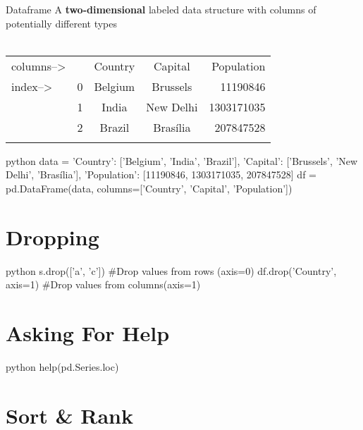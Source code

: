 \begin{myblock}{Dataframe}
A \textbf{two-dimensional} labeled data structure with columns of potentially different types\\\\

\begin{tabular}{ l|c||c|c|r| } 
\hhline{~----}
 columns--> &  & \cellcolor[HTML]{FFFFFF}  Country & \cellcolor[HTML]{FFFFFF}  Capital & \cellcolor[HTML]{FFFFFF}  Population\\
 \hhline{~====}
 index--> & \cellcolor[HTML]{FFFFFF} 0 & Belgium & Brussels & 11190846\\
 \hhline{~----}
  & \cellcolor[HTML]{FFFFFF} 1 & India & New Delhi & 1303171035\\
 \hhline{~----}
  & \cellcolor[HTML]{FFFFFF} 2 & Brazil & Brasília & 207847528\\
 \hhline{~----}
\end{tabular}
\end{myblock}

\begin{codebox}{python}{}
data = {'Country': ['Belgium', 'India', 'Brazil'], 'Capital': ['Brussels', 'New Delhi', 'Brasília'], 'Population': [11190846, 1303171035, 207847528]}
df = pd.DataFrame(data, columns=['Country', 'Capital', 'Population'])
\end{codebox}

\section{Dropping}

\begin{codebox}{python}{}
s.drop(['a', 'c'])  #Drop values from rows (axis=0)
df.drop('Country', axis=1) #Drop values from columns(axis=1)
\end{codebox}


\section{Asking For Help}

\begin{codebox}{python}{}
help(pd.Series.loc)
\end{codebox}


\section{Sort \& Rank}

